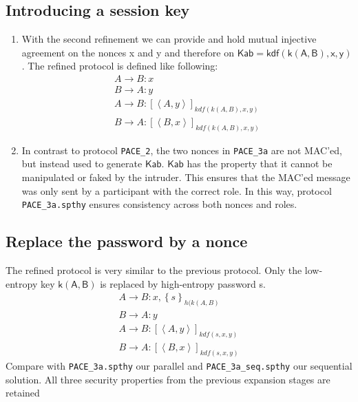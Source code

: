 \documentclass[a4paper,11pt]{scrartcl}
\newcommand{\tuple}[1]{\left\langle #1\right\rangle}
\begin{document}
\subsection{Introducing a session key}
\begin{enumerate}[label=\alph*)]
	\item With the second refinement we can provide and hold mutual injective agreement on the nonces x and y and therefore on $\mathsf{Kab = kdf(k(A,B),x,y)}$. The refined 		protocol is defined like following:
	\begin{align*}
	A \rightarrow B: x\\
	B \rightarrow A: y\\
	A \rightarrow B: [\tuple{A,  y}]_{kdf(k(A,  B), x, y)}\\
	B \rightarrow A: [\tuple{B,  x}]_{kdf(k(A,  B), x, y)}
	\end{align*}
	\item In contrast to protocol \texttt{PACE_2}, the two nonces in \texttt{PACE_3a} are not MAC'ed, but instead used to generate $\mathsf{Kab}$.  $\mathsf{Kab}$ has the 				property that it cannot be manipulated or faked by the intruder. This ensures that the MAC'ed message was only sent by a participant with the correct role. In this way,  protocol 	\texttt{PACE_3a.spthy} ensures consistency across both nonces and roles. 
\end{enumerate}
\subsection{Replace the password by a nonce}
The refined protocol is very similar to the previous protocol. Only the low-entropy key $\mathsf{k(A,B)}$ is replaced by high-entropy password s.
	\begin{align*}
	A \rightarrow B: x, \left\lbrace s \right\rbrace_{h(k(A,B)}\\
	B \rightarrow A: y\\
	A \rightarrow B: [\tuple{A,  y}]_{kdf(s, x, y)}\\
	B \rightarrow A: [\tuple{B,  x}]_{kdf(s, x, y)}
	\end{align*}
	Compare with \texttt{PACE_3a.spthy} our parallel and \texttt{PACE_3a_seq.spthy} our sequential solution.  All three security properties from the previous expansion stages 		are retained
\end{document}
